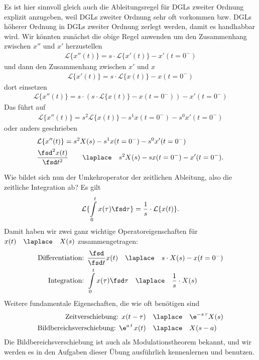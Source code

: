 Es ist hier sinnvoll gleich auch die Ableitungsregel für DGLs zweiter Ordnung
explizit anzugeben, weil DGLs zweiter Ordnung sehr oft vorkommen bzw.
DGLs höherer Ordnung in DGLs zweiter Ordnung zerlegt werden, damit es handhabbar
wird.
%
Wir könnten zunächst die obige Regel  anwenden um den
Zusammenhang  zwischen $x''$ und $x'$ herzustellen
\begin{align}
\mathcal{L}\{x''(t)\}  = s \cdot \mathcal{L}\{x'(t)\} - x'(t=0^-)
\end{align}
und dann den Zusammenhang zwischen $x'$ und $x$
\begin{align}
\mathcal{L}\{x'(t)\}  = s \cdot \mathcal{L}\{x(t)\} - x(t=0^-)
\end{align}
dort einsetzen
\begin{align}
\mathcal{L}\{x''(t)\}  = s \cdot (s \cdot \mathcal{L}\{x(t)\} - x(t=0^-)) - x'(t=0^-)
\end{align}
Das führt auf
\begin{align}
\mathcal{L}\{x''(t)\}  = s^2 \mathcal{L}\{x(t)\} - s^1 x(t=0^-) - s^0 x'(t=0^-)
\end{align}
oder anders geschrieben
\begin{align}
&\mathcal{L}\{x''(t)\} = s^2 X(s) - s^1 x(t=0^-) - s^0 x'(t=0^-)\\
&\frac{\fsd^2 x(t)}{\fsd t^2} \qquad \laplace \quad s^2 X(s) - s x(t=0^-) - x'(t=0^-).
\end{align}

Wie bildet sich nun der Umkehroperator der zeitlichen Ableitung, also die zeitliche
Integration ab? Es gilt
\begin{align}
\mathcal{L}\{\int\limits_{0}^{t} x(\tau)\fsd \tau\}  = \frac{1}{s} \cdot \mathcal{L}\{x(t)\}.
\end{align}
Damit haben wir zwei ganz wichtige Operatoreigenschaften für
$x(t)\quad\laplace\quad X(s)$ zusammengetragen:
\begin{align}
\text{Differentiation:   } &\frac{\fsd }{\fsd t}  x(t) \quad\laplace\quad s\cdot X(s) - x(t=0^-)\\
\text{Integration:   } &\int\limits_{0}^{t} x(\tau) \fsd\tau\quad\laplace\quad \frac{1}{s} \cdot X(s)
\end{align}
%
Weitere fundamentale Eigenschaften, die wie oft benötigen sind
\begin{align}
\text{Zeitverschiebung:   } x(t-\tau)& \quad\laplace\quad \e^{-s\,\tau} X(s)\\
\text{Bildbereichsverschiebung:   } \e^{a\,t} \, x(t)& \quad\laplace\quad X(s-a)
\end{align}
Die Bildbereichsverschiebung ist auch als Modulationstheorem bekannt,
und wir werden es in den Aufgaben dieser Übung ausführlich kennenlernen und
benutzen.


